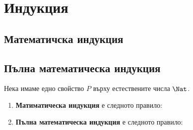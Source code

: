 \chapter{Индукция}

\section{Математичска индукция}

\section{Пълна математическа индукция}

Нека имаме едно свойство $P$ върху естествените числа $\Nat$.
\begin{enumerate}
\item {\bf Матиматическа индукция} е следното правило:
  \begin{prooftree}
  \end{prooftree}
  
\item
  {\bf Пълна математическа индукция} е следното правило:
  \begin{prooftree}
  \end{prooftree}
\end{enumerate}

